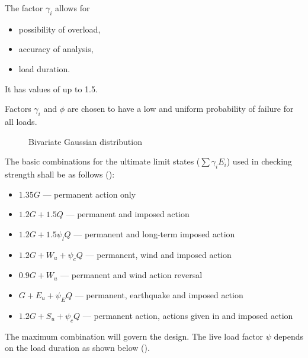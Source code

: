 The factor $\gamma_i$ allows for
\begin{itemize}
\item possibility of overload,
\item accuracy of analysis,
\item load duration.
\end{itemize}
It has values of up to \num{1.5}.

Factors $\gamma_i$ and $\phi$ are chosen to have a low and uniform probability of failure for all loads.
\begin{figure}[H]
\centering

\caption{Bivariate Gaussian distribution}
\end{figure}

The basic combinations for the ultimate limit states ($\displaystyle\sum\gamma_iE_i$) used in checking strength shall be as follows ():
\begin{itemize}
\item $1.35G$ --- permanent action only
\item $1.2G+1.5Q$ --- permanent and imposed action
\item $1.2G+1.5\psi_lQ$ --- permanent and long-term imposed action
\item $1.2G+W_u+\psi_cQ$ --- permanent, wind and imposed action
\item $0.9G+W_u$ --- permanent and wind action reversal
\item $G+E_u+\psi_EQ$ --- permanent, earthquake and imposed action
\item $1.2G+S_u+\psi_cQ$ --- permanent action, actions given in  and imposed action
\end{itemize}
The maximum combination will govern the design. The live load factor $\psi$ depends on the load duration as shown below ().
